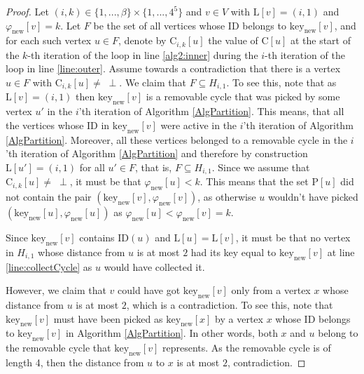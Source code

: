 \documentclass{article}
\theoremstyle{definition}
\begin{document}
\begin{proof} Let $(i,k) \in \{1, ..., \beta\} \times \{1, ..., 4^5\}$ and $v \in V$ with $\text{L}[v] = (i,1)$ and $\varphi_{\text{new}}[v] = k$. Let $F$ be the set of all vertices whose ID belongs to $\text{key}_{\text{new}}[v]$, and for each such vertex $u \in F$, denote by $\text{C}_{i,k}[u]$ the value of $\text{C}[u]$ at the start of the $k$-th iteration of the loop in line \ref{alg2:inner} during the $i$-th iteration of the loop in line \ref{line:outer}. Assume towards a contradiction that there is a vertex $u \in F$ with $\text{C}_{i,k}[u] \ne \;\perp$.
We claim that $F \subseteq H_{i,1}$. To see this, note that as $\text{L}[v] = (i,1)$ then $\text{key}_{\text{new}}[v]$ is a removable cycle that was picked by some vertex $u'$
in the $i$'th iteration of Algorithm \ref{AlgPartition}.
This means, that all the vertices whose ID in $\text{key}_{\text{new}}[v]$ were active in the $i$'th iteration of Algorithm \ref{AlgPartition}.
Moreover, all these vertices belonged to a removable cycle in the $i$'th iteration of Algorithm \ref{AlgPartition} and therefore by construction $\text{L}[u'] = (i,1)$ for all $u' \in F$, that is,  $F \subseteq H_{i,1}$.
Since we assume that $\text{C}_{i,k}[u] \ne \;\perp$, it must be that $\varphi_{\text{new}}[u] < k$.
This means that the set $\text{P}[u]$ did not contain the pair $(\text{key}_{\text{new}}[v],\varphi_{\text{new}}[v])$, as otherwise $u$ wouldn't have picked
$(\text{key}_{\text{new}}[u], \varphi_{\text{new}}[u])$ as $\varphi_{\text{new}}[u] < \varphi_{\text{new}}[v] = k$.

Since $\text{key}_{\text{new}}[v]$ contains $\text{ID}(u)$ and $\text{L}[u] = \text{L}[v]$, it must be that no vertex in $H_{i,1}$ whose distance from $u$ is at most $2$ had its key equal to $\text{key}_{\text{new}}[v]$ at line \ref{line:collectCycle} as $u$ would have collected it.

However, we claim that $v$ could have got $\text{key}_{\text{new}}[v]$ only from a vertex $x$
whose distance from $u$ is at most $2$, which is a contradiction.
To see this, note that $\text{key}_{\text{new}}[v]$ must have been picked as $\text{key}_{\text{new}}[x]$ by a vertex $x$ whose ID belongs to
$\text{key}_{\text{new}}[v]$ in Algorithm \ref{AlgPartition}.
In other words, both $x$ and $u$ belong to the removable cycle that $\text{key}_{\text{new}}[v]$ represents. As the removable cycle is of length 4, then the distance from $u$ to $x$ is at most $2$, contradiction.\end{proof}
\end{document}
